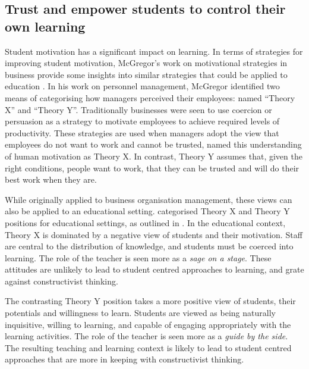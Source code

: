 
\subsection{Trust and empower students to control their own learning} %
\label{ssub:trust_and_empower_students_to_control_their_own_learning}

Student motivation has a significant impact on learning. In terms of strategies for improving student motivation, McGregor's work on motivational strategies in business provide some insights into similar strategies that could be applied to education \cite{McGregor:1960}.  In his work on personnel management, McGregor identified two means of categorising how managers perceived their employees: named ``Theory X'' and ``Theory Y''. Traditionally businesses were seen to use coercion or persuasion as a strategy to motivate employees to achieve required levels of productivity. These strategies are used when managers adopt the view that employees do not want to work and cannot be trusted, \citet{McGregor:1960} named this understanding of human motivation as Theory X. In contrast, Theory Y assumes that, given the right conditions, people want to work, that they can be trusted and will do their best work when they are.

While originally applied to business organisation management, these views can also be applied to an educational setting. \citet{Markwell:2004} categorised Theory X and Theory Y positions for educational settings, as outlined in . In the educational context, Theory X is dominated by a negative view of students and their motivation. Staff are central to the distribution of knowledge, and students must be coerced into learning. The role of the teacher is seen more as a \emph{sage on a stage}. These attitudes are unlikely to lead to student centred approaches to learning, and grate against constructivist thinking.

The contrasting Theory Y position takes a more positive view of students, their potentials and willingness to learn. Students are viewed as being naturally inquisitive, willing to learning, and capable of engaging appropriately with the learning activities. The role of the teacher is seen more as a \emph{guide by the side}. The resulting teaching and learning context is likely to lead to student centred approaches that are more in keeping with constructivist thinking.

